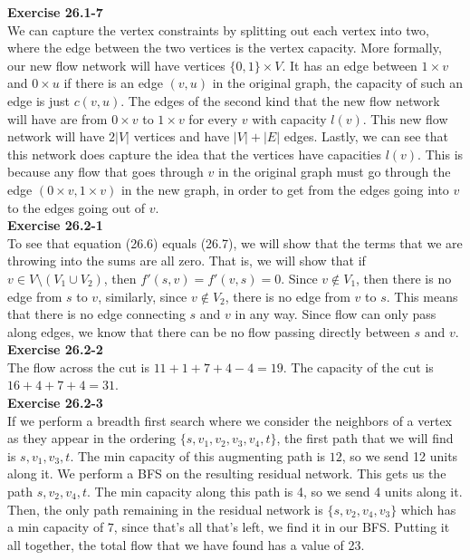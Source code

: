 \documentclass{article}
\begin{document}
\noindent\textbf{Exercise 26.1-7}\\

We can capture the vertex constraints by splitting out each vertex into two, where the edge between the two vertices is the vertex capacity. More formally, our new flow network will have vertices $\{0,1\} \times V$. It has an edge between $1 \times v$ and $0 \times u$ if there is an edge $(v,u)$ in the original graph, the capacity of such an edge is just $c(v,u)$. The edges of the second kind that the new flow network will have are from $0\times v$ to $1\times v$ for every $v$ with capacity $l(v)$. This new flow network will have $2|V|$ vertices and have $|V|+|E|$ edges. Lastly, we can see that this network does capture the idea that the vertices have capacities $l(v)$. This is because any flow that goes through $v$ in the original graph must go through the edge $(0\times v, 1\times v)$ in the new graph, in order to get from the edges going into $v$ to the edges going out of $v$.\\



\noindent\textbf{Exercise 26.2-1}\\

To see that equation (26.6) equals (26.7), we will show that the terms that we are throwing into the sums are all zero. That is, we will show that if $v\in V\setminus(V_1 \cup V_2)$, then $f'(s,v) = f'(v,s) = 0$. Since $v\not\in V_1$, then there is no edge from $s$ to $v$, similarly, since $v\not\in V_2$, there is no edge from $v$ to $s$. This means that there is no edge connecting $s$ and $v$ in any way. Since flow can only pass along edges, we know that there can be no flow passing directly between $s$ and $v$.\\

\noindent\textbf{Exercise 26.2-2}\\

The flow across the cut is $11 + 1 + 7 + 4 - 4 = 19$.  The capacity of the cut is $16 + 4 + 7 + 4 = 31$.\\


\noindent\textbf{Exercise 26.2-3}\\
If we perform a breadth first search where we consider the neighbors of a vertex as they appear in the ordering $\{s,v_1,v_2,v_3,v_4,t\}$, the first path that we will find is $s,v_1,v_3,t$. The min capacity of this augmenting path is $12$, so we send 12 units along it. We perform a BFS on the resulting residual network. This gets us the path $s,v_2,v_4,t$. The min capacity along this path is 4, so we send 4 units along it. Then, the only path remaining in the residual network is $\{s,v_2,v_4,v_3\}$ which has a min capacity of $7$, since that's all that's left, we find it in our BFS. Putting it all together, the total flow that we have found has a value of 23.
\end{document}
